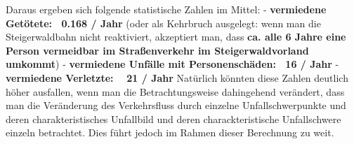 \documentclass[fontsize=12pt,a4paper]{scrreprt}
\begin{document}
Daraus ergeben sich folgende statistische Zahlen im Mittel:\newline
\newline
- \textbf{vermiedene Getötete: ~0.168 / Jahr} (oder als Kehrbruch ausgelegt: wenn man die Steigerwaldbahn nicht reaktiviert, akzeptiert man, dass \textbf{ca. alle 6 Jahre eine Person vermeidbar im Straßenverkehr im Steigerwaldvorland umkommt})\newline
- \textbf{vermiedene Unfälle mit Personenschäden: ~16 / Jahr}\newline
- \textbf{vermiedene Verletzte: ~ 21 / Jahr}\newline
\newline
Natürlich könnten diese Zahlen deutlich höher ausfallen, wenn man die Betrachtungsweise dahingehend verändert, dass man die Veränderung des Verkehrsfluss durch einzelne Unfallschwerpunkte und deren charakteristisches Unfallbild und deren charackteristische Unfallschwere einzeln betrachtet. Dies führt jedoch im Rahmen dieser Berechnung zu weit.
\end{document}
